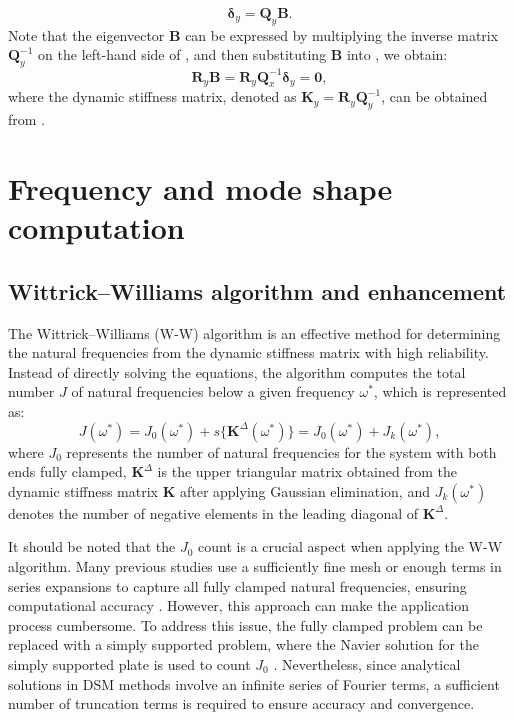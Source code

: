 \documentclass[preprint,12pt]{elsarticle}
\begin{document}
%
\begin{equation}\label{eq:UBy1}
	\mathbf{\delta}_y= \mathbf{Q}_y\mathbf{B}.
\end{equation}
%
Note that the eigenvector \(\mathbf{B}\) can be expressed by multiplying the inverse matrix \(\mathbf{Q}_y^{-1}\) on the left-hand side of , and then substituting \(\mathbf{B}\) into , we obtain:
%
\begin{equation}\label{eq:DSM_eqy}
	\mathbf{R}_y\mathbf{B}=\mathbf{R}_y \mathbf{Q}_x^{-1} 
	\mathbf{\delta}_y = \mathbf{0},
\end{equation}
%
where the dynamic stiffness matrix, denoted as \(\mathbf{K}_y = \mathbf{R}_y \mathbf{Q}_y^{-1}\), can be obtained from .

\section{Frequency and mode shape computation}\label{sec:WWA}
\subsection{Wittrick–Williams algorithm and enhancement}\label{sec:WWA2}
The Wittrick–Williams (W-W) algorithm \cite{wittrick1971general} is an effective method for determining the natural frequencies from the dynamic stiffness matrix with high reliability. 
Instead of directly solving the equations, the algorithm computes the total number \(J\) of natural frequencies below a given frequency \(\omega^*\), which is represented as:
\begin{equation}\label{eq:WWalgorithm}
	J(\omega^*) = J_0(\omega^*) + s\{\mathbf{K}^{\Delta}(\omega^*)\} = J_0(\omega^*) + J_k(\omega^*),
\end{equation}
where \(J_0\) represents the number of natural frequencies for the system with both ends fully clamped, \(\mathbf{K}^{\Delta}\) is the upper triangular matrix obtained from the dynamic stiffness matrix \(\mathbf{K}\) after applying Gaussian elimination, and \(J_k(\omega^*)\) denotes the number of negative elements in the leading diagonal of \(\mathbf{K}^{\Delta}\).

It should be noted that the \( J_0 \) count is a crucial aspect when applying the W-W algorithm. Many previous studies use a sufficiently fine mesh or enough terms in series expansions to capture all fully clamped natural frequencies, ensuring computational accuracy \cite{banerjee2015dynamic}. However, this approach can make the application process cumbersome. 
To address this issue, the fully clamped problem can be replaced with a simply supported problem, where the Navier solution for the simply supported plate is used to count \( J_0 \) \citep{liu2015exact}. 
Nevertheless, since analytical solutions in DSM methods involve an infinite series of Fourier terms, a sufficient number of truncation terms is required to ensure accuracy and convergence.   
\end{document}
